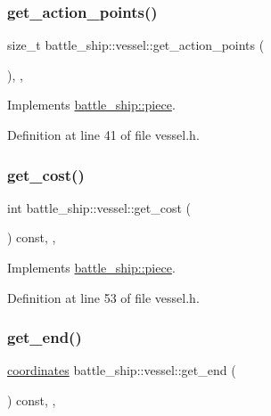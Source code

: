 \subsubsection{\texorpdfstring{get\+\_\+action\+\_\+points()}{get\_action\_points()}}
{\footnotesize\ttfamily size\+\_\+t battle\+\_\+ship\+::vessel\+::get\+\_\+action\+\_\+points (\begin{DoxyParamCaption}{ }\end{DoxyParamCaption})\hspace{0.3cm}{\ttfamily [inline]}, {\ttfamily [override]}, {\ttfamily [virtual]}}



Implements \hyperlink{classbattle__ship_1_1piece_a63f00d666a65cd41a11b592d55411b7f}{battle\+\_\+ship\+::piece}.



Definition at line 41 of file vessel.\+h.

\mbox{\label{classbattle__ship_1_1vessel_aadca1fe2ac265ed9f22e68490b6b22eb}} 
\subsubsection{\texorpdfstring{get\+\_\+cost()}{get\_cost()}}
{\footnotesize\ttfamily int battle\+\_\+ship\+::vessel\+::get\+\_\+cost (\begin{DoxyParamCaption}{ }\end{DoxyParamCaption}) const\hspace{0.3cm}{\ttfamily [inline]}, {\ttfamily [override]}, {\ttfamily [virtual]}}



Implements \hyperlink{classbattle__ship_1_1piece_a9193782bce8a697bd5d3cb391d5f1623}{battle\+\_\+ship\+::piece}.



Definition at line 53 of file vessel.\+h.

\mbox{\label{classbattle__ship_1_1vessel_ab24ee1fe21632b510833c8369ef3560a}} 
\subsubsection{\texorpdfstring{get\+\_\+end()}{get\_end()}}
{\footnotesize\ttfamily \hyperlink{structbattle__ship_1_1coordinates}{coordinates} battle\+\_\+ship\+::vessel\+::get\+\_\+end (\begin{DoxyParamCaption}{ }\end{DoxyParamCaption}) const\hspace{0.3cm}{\ttfamily [inline]}, {\ttfamily [override]}, {\ttfamily [virtual]}}



